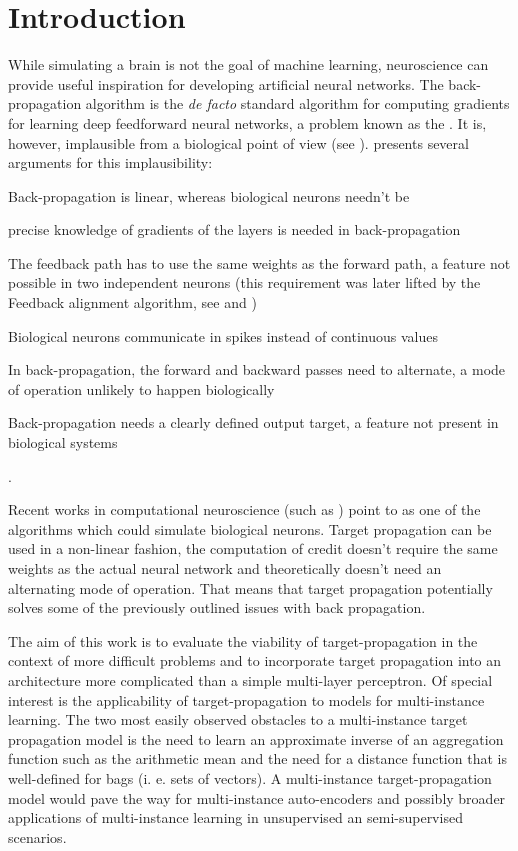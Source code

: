 \chapter{Introduction}

While simulating a brain is not the goal of machine learning, neuroscience can provide useful inspiration for developing artificial neural networks. The back-propagation algorithm is the \textit{de facto} standard algorithm for computing gradients for learning deep feedforward neural networks, a problem known as the . It is, however, implausible from a biological point of view (see \cite{crick_recent_1989}). \cite{bengio_towards_2015} presents several arguments for this implausibility:
\begin{enumerate*}[label=(\arabic*)]
	\item Back-propagation is linear, whereas biological neurons needn't be
	\item precise knowledge of gradients of the layers is needed in back-propagation
	\item The feedback path has to use the same weights as the forward path, a feature not possible in two independent neurons (this requirement was later lifted by the Feedback alignment algorithm, see \cite{lillicrap_random_2016} and \cite{nokland_direct_2016})
	\item Biological neurons communicate in spikes instead of continuous values
	\item In back-propagation, the forward and backward passes need to alternate, a mode of operation unlikely to happen biologically
	\item Back-propagation needs a clearly defined output target, a feature not present in biological systems
\end{enumerate*}.

Recent works in computational neuroscience (such as \cite{guerguiev_towards_2017}) point to  as one of the algorithms which could simulate biological neurons. Target propagation can be used in a non-linear fashion, the computation of credit doesn't require the same weights as the actual neural network and theoretically doesn't need an alternating mode of operation. That means that target propagation potentially solves some of the previously outlined issues with back propagation.

The aim of this work is to evaluate the viability of target-propagation in the context of more difficult problems and to incorporate target propagation into an architecture more complicated than a simple multi-layer perceptron. Of special interest is the applicability of target-propagation to models for multi-instance learning. The two most easily observed obstacles to a multi-instance target propagation model is the need to learn an approximate inverse of an aggregation function such as the arithmetic mean and the need for a distance function that is well-defined for bags (i. e. sets of vectors). A multi-instance target-propagation model would pave the way for multi-instance auto-encoders and possibly broader applications of multi-instance learning in unsupervised an semi-supervised scenarios.

